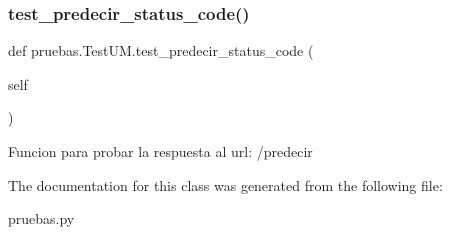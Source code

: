 \subsubsection{\texorpdfstring{test\+\_\+predecir\+\_\+status\+\_\+code()}{test\_predecir\_status\_code()}}
{\footnotesize\ttfamily def pruebas.\+Test\+U\+M.\+test\+\_\+predecir\+\_\+status\+\_\+code (\begin{DoxyParamCaption}\item[{}]{self }\end{DoxyParamCaption})}

\begin{DoxyVerb}Funcion para probar la respuesta al url: /predecir
\end{DoxyVerb}
 

The documentation for this class was generated from the following file\+:\begin{DoxyCompactItemize}
\item 
pruebas.\+py\end{DoxyCompactItemize}
